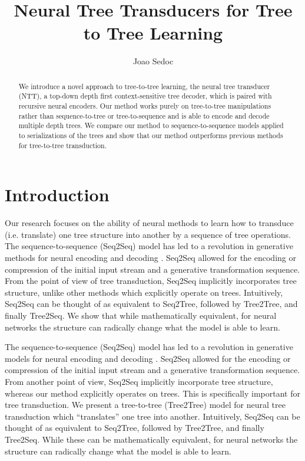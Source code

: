 \documentclass{article}
\title{Neural Tree Transducers for Tree to Tree Learning}
\author{
Joao Sedoc}
\begin{document}

\maketitle

\begin{abstract}
We introduce a novel approach to tree-to-tree learning, the neural tree transducer (NTT), a top-down depth first context-sensitive tree decoder, which is paired with recursive neural encoders. Our method works purely on tree-to-tree manipulations rather than sequence-to-tree or tree-to-sequence and is able to encode and decode multiple depth trees. We compare our method to sequence-to-sequence models applied to serializations of the trees and show that our method outperforms previous methods for tree-to-tree transduction. 
\end{abstract}

\section{Introduction}
Our research focuses on the ability of neural methods to learn how to transduce (i.e. translate) one tree structure into another by a sequence of tree operations.
The sequence-to-sequence (Seq2Seq) model has led to a revolution in generative methods for neural encoding and decoding \citep{sutskever2014sequence}. Seq2Seq allowed for the encoding or compression of the initial input stream and a generative transformation sequence. From the point of view of tree transduction, Seq2Seq implicitly incorporates tree structure, unlike other methods which explicitly operate on trees.  
Intuitively, Seq2Seq can be thought of as equivalent to Seq2Tree, followed by Tree2Tree, and finally Tree2Seq. We show that while mathematically equivalent, for neural networks the structure can radically change what the model is able to learn.

The sequence-to-sequence (Seq2Seq) model has led to a revolution in generative models for neural encoding and decoding \citep{sutskever2014sequence}. Seq2Seq allowed for the encoding or compression of the initial input stream and a generative transformation sequence. 
From another point of view, Seq2Seq implicitly incorporate tree structure, whereas our method explicitly operates on trees. This is specifically important for tree transduction. We present a tree-to-tree (Tree2Tree) model for neural tree transduction which ``translates'' one tree into another. 
Intuitively, Seq2Seq can be thought of as equivalent to Seq2Tree, followed by Tree2Tree, and finally Tree2Seq. While these can be mathematically equivalent, for neural networks the structure can radically change what the model is able to learn.
\end{document}
